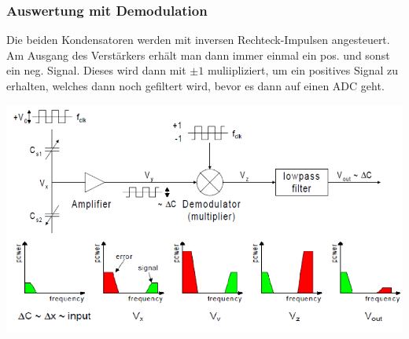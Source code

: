 \subsubsection{Auswertung mit Demodulation}
\begin{minipage}{0.3\textwidth}
  Die beiden Kondensatoren werden mit inversen Rechteck-Impulsen angesteuert. Am Ausgang des Verstärkers erhält man dann immer einmal ein pos. und sonst ein neg. Signal. Dieses wird dann mit $\pm 1$ muliipliziert, um ein positives Signal zu erhalten, welches dann noch gefiltert wird, bevor es dann auf einen ADC geht.
\end{minipage}
\hfill
\begin{minipage}{0.6\textwidth}
    \vspace{0pt}
    \hspace{-0.7cm}
    \includegraphics[width=1.0\textwidth]{images/Demodulation}
\end{minipage}

